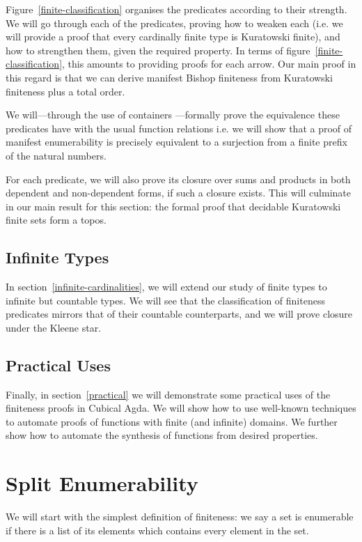 Figure~\ref{finite-classification} organises the predicates according to
their strength.
We will go through each of the predicates, proving how to weaken each (i.e. we
will provide a proof that every cardinally finite type is Kuratowski finite),
and how to strengthen them, given the required property.
In terms of figure~\ref{finite-classification}, this amounts to providing proofs
for each arrow.
Our main proof in this regard is that we can derive manifest Bishop finiteness
from Kuratowski finiteness plus a total order.

We will---through the use of containers
\cite{abbottContainersConstructingStrictly2005}---formally prove the equivalence
these predicates have with the usual function relations i.e. we will show that a
proof of manifest enumerability is precisely equivalent to a surjection from a
finite prefix of the natural numbers.

For each predicate, we will also prove its closure over sums and products in
both dependent and non-dependent forms, if such a closure exists.
This will culminate in our main result for this section: the formal proof that
decidable Kuratowski finite sets form a topos.
\subsection{Infinite Types}
In section~\ref{infinite-cardinalities}, we will extend our study of finite
types to infinite but countable types.
We will see that the classification of finiteness predicates mirrors that of
their countable counterparts, and we will prove closure under the Kleene star.

\subsection{Practical Uses}
Finally, in section~\ref{practical} we will demonstrate some practical uses of
the finiteness proofs in Cubical Agda.
We will show how to use well-known techniques
\cite{firsovDependentlyTypedProgramming2015, devrieseBrightSideType2011} to
automate proofs of functions with finite (and infinite) domains.
We further show how to automate the synthesis of functions from desired
properties.
\section{Split Enumerability} \label{split-enumerable}
We will start with the simplest definition of finiteness: we say a set is
enumerable if there is a list of its elements which contains every element in
the set.

